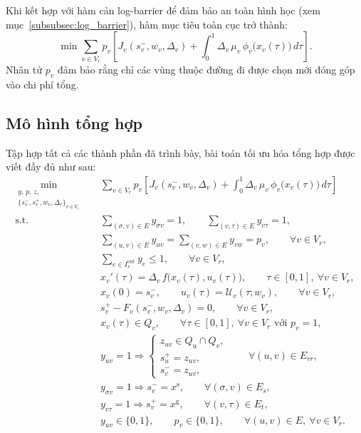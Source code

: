 Khi kết hợp với hàm cản log-barrier để đảm bảo an toàn hình học (xem mục~\ref{subsubsec:log_barrier}), hàm mục tiêu toàn cục trở thành:
\begin{equation}
\min \sum_{v\in V_r} p_v\!\left[J_v(s_v^-,w_v,\Delta_v)
+ \int_0^1 \Delta_v\,\mu_v\,\phi_v\bigl(x_v(\tau)\bigr)\,d\tau\right].
\label{eq:global_cost_barrier}
\end{equation}
Nhân tử $p_v$ đảm bảo rằng chỉ các vùng thuộc đường đi được chọn mới đóng góp vào chi phí tổng.

\subsection{Mô hình tổng hợp}
\label{subsec:full_formulation}

Tập hợp tất cả các thành phần đã trình bày, bài toán tối ưu hóa tổng hợp được viết đầy đủ như sau:
\begin{align}
\min_{\substack{y,\,p,\,z,\\ \{s_v^-,s_v^+,w_v,\Delta_v\}_{v\in V_r}}}
\quad & \sum_{v\in V_r} p_v\!\left[J_v(s_v^-,w_v,\Delta_v)
+ \int_0^1 \Delta_v\,\mu_v\,\phi_v\bigl(x_v(\tau)\bigr)\,d\tau\right]
\label{eq:joint_obj}\\[6pt]
\text{s.t.}\quad
& \sum_{(\sigma,v)\in E} y_{\sigma v}=1,
\qquad
\sum_{(v,\tau)\in E} y_{v\tau}=1,
\label{eq:joint_source_sink}\\
& \sum_{(u,v)\in E} y_{uv}
=
\sum_{(v,w)\in E} y_{vw}
=
p_v,
\qquad \forall v\in V_r,
\label{eq:joint_flow}\\
& \sum_{e\in I_v^{\mathrm{out}}} y_e \le 1,
\qquad \forall v\in V_r,
\label{eq:joint_acyc}\\[6pt]
& x_v'(\tau)=\Delta_v\,f\bigl(x_v(\tau),u_v(\tau)\bigr),
\qquad \tau\in[0,1],\ \forall v\in V_r,
\label{eq:joint_dyn}\\
& x_v(0)=s_v^-,
\qquad
u_v(\tau)=\mathcal{U}_v(\tau;w_v),
\qquad \forall v\in V_r,
\label{eq:joint_ivp}\\
& s_v^+ - F_v(s_v^-,w_v,\Delta_v)=0,
\qquad \forall v\in V_r,
\label{eq:joint_defect}\\[6pt]
& x_v(\tau)\in Q_v,
\qquad \forall \tau\in[0,1],\ \forall v\in V_r \text{ với } p_v=1,
\label{eq:joint_region}\\[6pt]
& y_{uv}=1 \Longrightarrow
\begin{cases}
z_{uv}\in Q_u\cap Q_v,\\
s_u^+=z_{uv},\\
s_v^-=z_{uv},
\end{cases}
\qquad \forall (u,v)\in E_{rr},
\label{eq:joint_edge}\\
& y_{\sigma v}=1 \Longrightarrow s_v^-=x^{\mathrm s},
\qquad \forall (\sigma,v)\in E_s,
\label{eq:joint_source}\\
& y_{v\tau}=1 \Longrightarrow s_v^+=x^{\mathrm g},
\qquad \forall (v,\tau)\in E_t,
\label{eq:joint_target}\\[6pt]
& y_{uv}\in\{0,1\},\qquad p_v\in\{0,1\},
\qquad \forall (u,v)\in E,\ \forall v\in V_r.
\label{eq:joint_binary}
\end{align}

